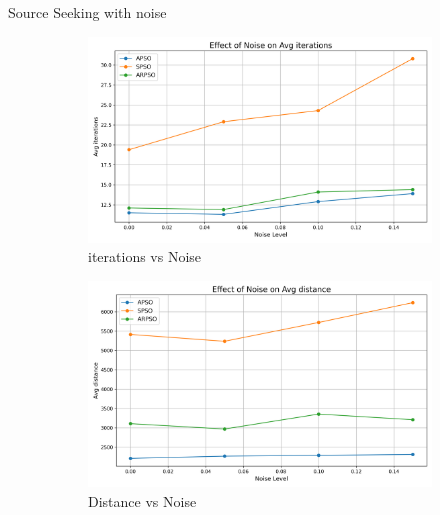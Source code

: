 \documentclass[aspectratio=169]{beamer}
\begin{document}
\begin{frame}{Source Seeking with noise}    
    \begin{figure}[h]
        \centering
        \begin{subfigure}[b]{0.32\textwidth}
            \centering
            \includegraphics[width=\textwidth]{plots/r1_with_noise/avg_iterations_vs_noise.png}
            \caption{iterations vs Noise}
        \end{subfigure}
        \hfill
        \begin{subfigure}[b]{0.32\textwidth}
            \centering
            \includegraphics[width=\textwidth]{plots/r1_with_noise/avg_distance_vs_noise.png}
            \caption{Distance vs Noise}
        \end{subfigure}
        \hfill
        \begin{subfigure}[b]{0.32\textwidth}
            \centering

\end{subfigure}
\end{figure}
\end{frame}
\end{document}
